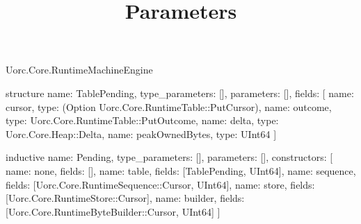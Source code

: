 \begin{lexlean}{Uorc.Core.RuntimeMachineEngine}
\title{Parameters}
\begin{semanticmodule}
structure{
  name: TablePending,
  type_parameters: [],
  parameters: [],
  fields: [
    {name: cursor, type: (Option Uorc.Core.RuntimeTable::PutCursor)},
    {name: outcome, type: Uorc.Core.RuntimeTable::PutOutcome},
    {name: delta, type: Uorc.Core.Heap::Delta},
    {name: peakOwnedBytes, type: UInt64}
  ]
}

inductive{
  name: Pending,
  type_parameters: [],
  parameters: [],
  constructors: [
    {name: none, fields: []},
    {name: table, fields: [TablePending, UInt64]},
    {name: sequence, fields: [Uorc.Core.RuntimeSequence::Cursor, UInt64]},
    {name: store, fields: [Uorc.Core.RuntimeStore::Cursor]},
    {name: builder, fields: [Uorc.Core.RuntimeByteBuilder::Cursor, UInt64]}
  ]
}


\end{semanticmodule}
\end{lexlean}
